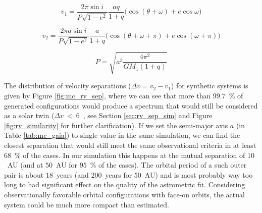 \begin{equation}
	\label{equ:rad_vel1}
	v_{1} = \frac{2 \pi \sin i}{P \sqrt{1 - e^2}} \frac{a q}{1+q} \Big(\cos(\theta + \omega) + e \cos \omega \Big)
\end{equation}

\begin{equation}
	\label{equ:rad_vel2}
	v_{2} = \frac{2 \pi a \sin i}{P \sqrt{1 - e^2}} \frac{a}{1+q} \Big(\cos(\theta + \omega + \pi) + e \cos (\omega  + \pi) \Big)
\end{equation}

\begin{equation}
	\label{equ:rad_period}
	P = \sqrt{a^3 \frac{4 \pi^2}{G M_1 (1 + q)}}
\end{equation}

The distribution of velocity separations ($\Delta v = v_2 - v_1$) for synthetic systems is given by Figure \ref{fig:mc_rv_sep}, where we can see that more than $99.7$~\% of generated configurations would produce a spectrum that would still be considered as a solar twin ($\Delta v$~<~6~\kms, see Section \ref{sec:rv_sep_sim} and Figure \ref{fig:rv_similarity} for further clarification). If we set the semi-major axis $a$ (in Table \ref{tab:mc_gaia}) to single value in the same simulation, we can find the closest separation that would still meet the same observational criteria in at least $68$~\% of the cases. In our simulation this happens at the mutual separation of $10$~AU (and at $50$~AU for $95$~\% of the cases). The orbital period of a such outer pair is about $18$~years (and $200$~years for $50$~AU) and is most probably way too long to had significant effect on the quality of the astrometric fit. Considering observationally favorable orbital configurations with face-on orbits, the actual system could be much more compact than estimated.

